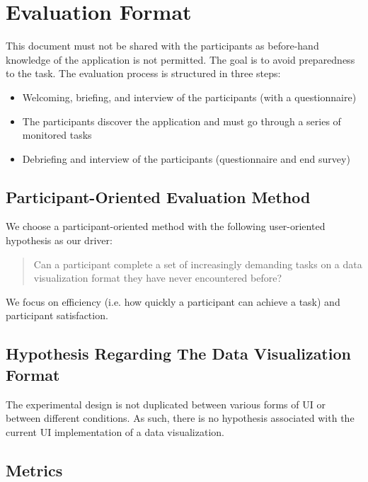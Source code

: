 \documentclass[twocolumn, letterpaper,13pt]{scrartcl}
\begin{document}
    \section*{Evaluation Format}

    This document must not be shared with the participants as before-hand knowledge of the application is not permitted. The goal is to avoid preparedness to the task.
    \newline
    \newline
    The evaluation process is structured in three steps:
    \begin{itemize}
        \item Welcoming, briefing, and interview of the participants (with a questionnaire)
        \item The participants discover the application and must go through a series of monitored tasks
        \item Debriefing and interview of the participants (questionnaire and end survey)
    \end{itemize}

    \subsection*{Participant-Oriented Evaluation Method}
    
    We choose a participant-oriented method with the following user-oriented hypothesis as our driver: 
    
    \begin{quote}
        Can a participant complete a set of increasingly demanding tasks on a data visualization format they have never encountered before?
    \end{quote}
    
    We focus on efficiency (i.e. how quickly a participant can achieve a task) and participant satisfaction.

    \subsection*{Hypothesis Regarding The Data Visualization Format}
 
    The experimental design is not duplicated between various forms of UI or between different conditions. As such, there is no hypothesis associated with the current UI implementation of a data visualization.
 
    \subsection*{Metrics}
    
\end{document}
